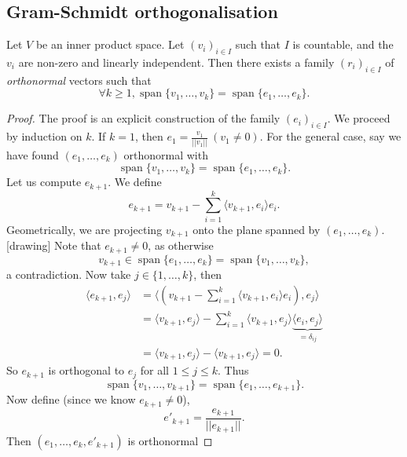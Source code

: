 \documentclass[a4paper]{scrartcl}
\begin{document}
\subsection{Gram-Schmidt orthogonalisation}
\begin{theorem}
      Let $V$ be an inner product space. Let $\left(v_i\right)_{i \in I}$ such that $I$ is countable, and the $v_i$ are non-zero and linearly independent. Then there exists a family $\left(r_i\right)_{i \in I}$ of \emph{orthonormal} vectors such that 
      \[\forall k \geq 1, \operatorname{span} \{v_1,\ldots ,v_k\}=\operatorname{span} \{e_1,\ldots ,e_k\}.\]
\end{theorem}

\begin{proof}
      The proof is an explicit construction of the family $\left(e_i\right)_{i \in I}$. We proceed by induction on $k$.\newline 
      If $k=1$, then $e_1=\frac{v_1}{||v_1||} \ \left(v_1 \neq 0\right)$. For the general case, say we have found $\left(e_1, \ldots ,e_k\right)$ orthonormal with 
      \[\operatorname{span} \{v_1,\ldots ,v_k\}=\operatorname{span} \{e_1,\ldots ,e_k\}.\]
      Let us compute $e_{k+1}$. We define 
      \[e_{k+1}=v_{k+1}-\sum_{i=1}^{k}\langle v_{k+1},e_i \rangle e_i .\]
      Geometrically, we are projecting $v_{k+1}$ onto the plane spanned by $\left(e_1, \ldots , e_k\right)$.[drawing] Note that $e_{k+1} \neq 0$, as otherwise 
      \[v_{k+1} \in \operatorname{span} \{e_1,\ldots ,e_k\}=\operatorname{span} \{v_1,\ldots ,v_k\},\]
      a contradiction. Now take $j \in \{1,\ldots ,k\}$, then 
      \begin{equation*}
          \begin{split}
               \langle e_{k+1},e_j \rangle&=\langle \left(v_{k+1}-\sum_{i=1}^{k}\langle v_{k+1},e_i \rangle e_i\right) ,e_j \rangle \\
               &=\langle v_{k+1},e_j \rangle - \sum_{i=1}^{k}\langle v_{k+1},e_j \rangle \underbrace{\langle e_i,e_j \rangle}_{=\delta_{ij}}\\
               &=\langle v_{k+1},e_j \rangle-\langle v_{k+1},e_j \rangle=0.
          \end{split}
      \end{equation*}
      So $e_{k+1}$ is orthogonal to $e_j$ for all $1 \leq j \leq k$. Thus 
      \[\operatorname{span} \{v_1,\ldots ,v_{k+1}\}=\operatorname{span} \{e_1,\ldots ,e_{k+1}\}.\]
      Now define (since we know $e_{k+1} \neq 0$), 
      \[e'_{k+1}=\frac{e_{k+1}}{||e_{k+1}||}.\]
      Then $\left(e_1, \ldots ,e_k, e'_{k+1}\right)$ is orthonormal
\end{proof}
\end{document}
